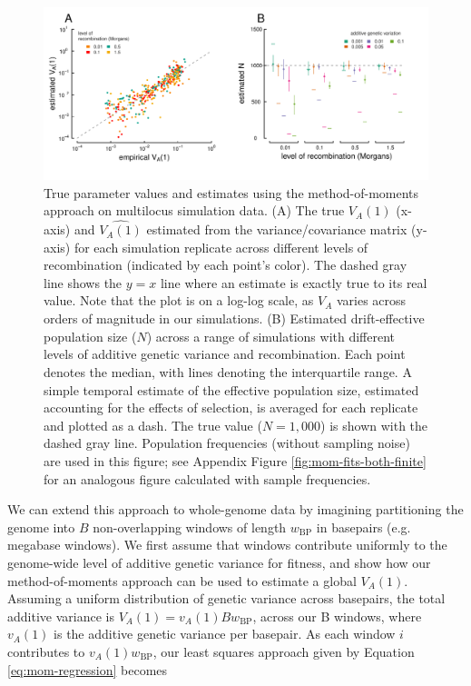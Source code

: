 \documentclass[11pt]{article}
\begin{document}
\begin{figure}
  \centering
  \includegraphics{./images/mom-fits-both-alt.pdf} 

  \caption{True parameter values and estimates using the method-of-moments
    approach on multilocus simulation data. (A) The true $V_A(1)$ (x-axis) and
    $\widehat{V_A(1)}$ estimated from the variance/covariance matrix (y-axis)
    for each simulation replicate across different levels of recombination
    (indicated by each point's color). The dashed gray line shows the $y=x$
    line where an estimate is exactly true to its real value. Note that the
    plot is on a log-log scale, as $V_A$ varies across orders of magnitude in
    our simulations. (B) Estimated drift-effective population size
    ($\widehat{N}$) across a range of simulations with different levels of
    additive genetic variance and recombination. Each point denotes the median,
    with lines denoting the interquartile range. A simple temporal estimate of
    the effective population size, estimated accounting for the effects of
    selection, is averaged for each replicate and plotted as a dash.  The true
    value ($N = 1,000$) is shown with the dashed gray line. Population
    frequencies (without sampling noise) are used in this figure; see Appendix
    Figure \ref{fig:mom-fits-both-finite} for an analogous figure calculated
    with sample frequencies.}

\label{fig:mom-fits-both}
\end{figure}

We can extend this approach to whole-genome data by imagining partitioning 
the genome into $B$ non-overlapping windows of length $w_{\textrm{BP}}$ in
basepairs (e.g. megabase windows). We first assume that windows contribute
uniformly to the genome-wide level of additive genetic variance for  fitness,
and show how our method-of-moments approach can be used to estimate a global
$V_A(1)$. Assuming a uniform distribution of genetic variance across basepairs,
the total additive variance is $V_A(1) = v_A(1) B w_{\text{BP}}$, across our B
windows, where $v_A(1)$ is the additive genetic variance per basepair. As each
window $i$ contributes to $v_A(1) w_{\text{BP}}$, our least squares approach
given by Equation \eqref{eq:mom-regression} becomes
\end{document}
